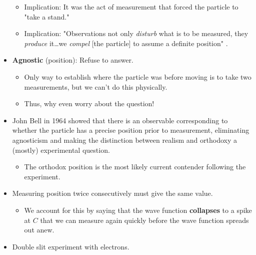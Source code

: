 \documentclass[../notes.tex]{subfiles}
\begin{document}
\begin{itemize}
    \begin{itemize}
        \item Implication: It was the act of measurement that forced the particle to "take a stand."
        \item Implication: "Observations not only \emph{disturb} what is to be measured, they \emph{produce} it\dots we \emph{compel} [the particle] to assume a definite position" \parencite[17]{bib:Griffiths}.
    \end{itemize}
    \item \textbf{Agnostic} (position): Refuse to answer.
    \begin{itemize}
        \item Only way to establish where the particle was before moving is to take two measurements, but we can't do this physically.
        \item Thus, why even worry about the question!
    \end{itemize}
    \item John Bell in 1964 showed that there is an observable corresponding to whether the particle has a precise position prior to measurement, eliminating agnosticism and making the distinction between realism and orthodoxy a (mostly) experimental question.
    \begin{itemize}
        \item The orthodox position is the most likely current contender following the experiment.
    \end{itemize}
    \item Measuring position twice consecutively must give the same value.
    \begin{itemize}
        \item We account for this by saying that the wave function \textbf{collapses} to a spike at $C$ that we can measure again quickly before the wave function spreads out anew.
    \end{itemize}
    \item Double slit experiment with electrons.
\end{itemize}
\end{document}
